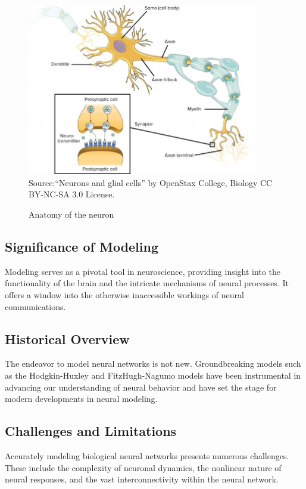 \documentclass[paper=a4, fontsize=11pt]{scrartcl} %
\numberwithin{equation}{section} %
\numberwithin{figure}{section} %
\numberwithin{table}{section} %
\begin{document}
\begin{figure}[H]
    \centering
    \caption{Anatomy of the neuron}
    \includegraphics[width=0.9\textwidth]{./data/neural.jpg}
    \footnotesize{Source:“Neurons and glial cells” by OpenStax College, Biology CC BY-NC-SA 3.0 License.}
    \label{fig:my_picture}
\end{figure}



\subsection{Significance of Modeling}
Modeling serves as a pivotal tool in neuroscience, providing insight into the functionality of the brain and the intricate mechanisms of neural processes. It offers a window into the otherwise inaccessible workings of neural communications.

\subsection{Historical Overview}
The endeavor to model neural networks is not new. Groundbreaking models such as the Hodgkin-Huxley and FitzHugh-Nagumo models have been instrumental in advancing our understanding of neural behavior and have set the stage for modern developments in neural modeling.

\subsection{Challenges and Limitations}
Accurately modeling biological neural networks presents numerous challenges. These include the complexity of neuronal dynamics, the nonlinear nature of neural responses, and the vast interconnectivity within the neural network.
\end{document}
